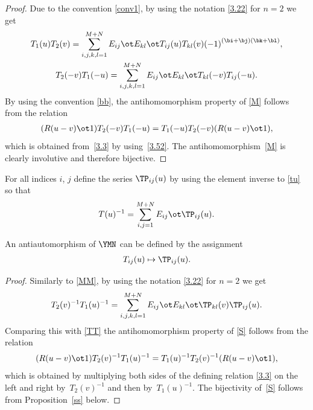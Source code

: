 \begin{proof}Due to the convention \eqref{conv1}, by using
the notation \eqref{3.22} for $n=2$ we get
\begin{gather}\label{TT}
T_1(u) T_2(v)=\sum_{i,j,k,l=1}^{M+N}
E_{ij}\ot E_{kl}\ot T_{ij}(u) T_{kl}(v)
{(-1)}^{( \bi+ \bj )( \bk+ \bl )} ,\\
\label{MM}
T_2(-v) T_1(-u)=\sum_{i,j,k,l=1}^{M+N}
E_{ij}\ot E_{kl}\ot T_{kl}(-v) T_{ij}(-u) .
\end{gather}
By using the convention \eqref{bb}, the antihomomorphism property of \eqref{M} follows from the relation
\begin{gather*}
(R (u-v)\ot1) T_2(-v) T_1(-u)=
T_1(-u) T_2(-v) (R (u-v)\ot1),
\end{gather*}
which is obtained from~\eqref{3.3} by using~\eqref{3.52}.
The antihomomorphism~\eqref{M} is clearly involutive and therefore bijective.
\end{proof}

For all indices $i$, $j$ define the series $\TP_{ij}(u)$
by using the element inverse to \eqref{tu} so that
\begin{gather}\label{tunat}
T(u)^{-1}=\sum_{i,j=1}^{M+N} E_{ij}\ot\TP_{ij}(u) .
\end{gather}

\begin{Proposition}\label{s}
An antiautomorphism of $\YMN$ can be defined by the assignment
\begin{gather}\label{S}
T_{ij}(u)\mapsto\TP_{ij}(u) .
\end{gather}
\end{Proposition}

\begin{proof}Similarly to \eqref{MM}, by using
the notation \eqref{3.22} for $n=2$ we get
\begin{gather*}
T_2(v)^{-1} T_1(u)^{-1}=\sum_{i,j,k,l=1}^{M+N}E_{ij}\ot E_{kl}\ot\TP_{kl}(v) \TP_{ij}(u) .
\end{gather*}
Comparing this with \eqref{TT} the antihomomorphism property of \eqref{S} follows from the relation
\begin{gather}\label{3.33}
(R (u-v)\ot1) T_2(v)^{-1} T_1(u)^{-1}=
T_1(u)^{-1} T_2(v)^{-1} (R (u-v)\ot1),
\end{gather}
which is obtained by multiplying both sides of the defining relation \eqref{3.3}
on the left and right by~$T_2(v)^{-1}$ and then by~$T_1(u)^{-1}$.
The bijectivity of~\eqref{S} follows from Proposition~\ref{ss} below.
\end{proof}

